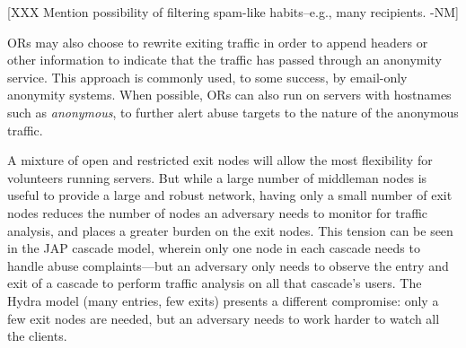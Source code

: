 \documentclass[times,10pt,twocolumn]{article}
\begin{document}
[XXX Mention possibility of filtering spam-like habits--e.g., many
  recipients. -NM]

ORs may also choose to rewrite exiting traffic in order to append
headers or other information to indicate that the traffic has passed
through an anonymity service.  This approach is commonly used, to some
success, by email-only anonymity systems.  When possible, ORs can also
run on servers with hostnames such as {\it anonymous}, to further
alert abuse targets to the nature of the anonymous traffic.



A mixture of open and restricted exit nodes will allow the most
flexibility for volunteers running servers. But while a large number
of middleman nodes is useful to provide a large and robust network,
having only a small number of exit nodes reduces the number of nodes
an adversary needs to monitor for traffic analysis, and places a
greater burden on the exit nodes.  This tension can be seen in the JAP
cascade model, wherein only one node in each cascade needs to handle
abuse complaints---but an adversary only needs to observe the entry
and exit of a cascade to perform traffic analysis on all that
cascade's users.  The Hydra model (many entries, few exits) presents a
different compromise: only a few exit nodes are needed, but an
adversary needs to work harder to watch all the clients.
\end{document}
